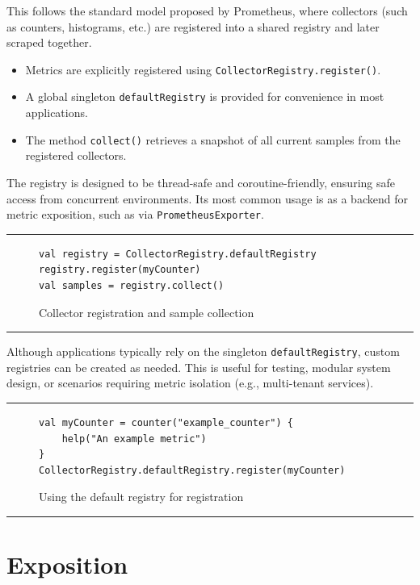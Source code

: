 This follows the standard model proposed by Prometheus, where collectors (such as counters, histograms, etc.) are registered into a shared registry and later scraped together.

\begin{itemize}
    \item Metrics are explicitly registered using \texttt{CollectorRegistry.register()}.
    \item A global singleton \texttt{defaultRegistry} is provided for convenience in most applications.
    \item The method \texttt{collect()} retrieves a snapshot of all current samples from the registered collectors.
\end{itemize}

The registry is designed to be thread-safe and coroutine-friendly, ensuring safe access from concurrent environments.
Its most common usage is as a backend for metric exposition, such as via \texttt{PrometheusExporter}.

\noindent\rule{\linewidth}{0.4pt}


\begin{figure}[h]
    \begin{lstlisting}
val registry = CollectorRegistry.defaultRegistry
registry.register(myCounter)
val samples = registry.collect()
    \end{lstlisting}
    \caption{Collector registration and sample collection}
\end{figure}

\noindent\rule{\linewidth}{0.4pt}


Although applications typically rely on the singleton \texttt{defaultRegistry}, custom registries can be created as needed. This is useful for testing, modular system design, or scenarios requiring metric isolation (e.g., multi-tenant services).

\noindent\rule{\linewidth}{0.4pt}


\begin{figure}[h]
    \begin{lstlisting}
val myCounter = counter("example_counter") {
    help("An example metric")
}
CollectorRegistry.defaultRegistry.register(myCounter)
    \end{lstlisting}
    \caption{Using the default registry for registration}
\end{figure}

\noindent\rule{\linewidth}{0.4pt}


\section{Exposition}\label{sec:exposition}

